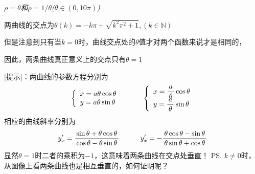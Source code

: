\begin{center}
	
	{\it$\rho=\theta$和$\rho=1/\theta$\quad($\theta\in(0,10\pi)$)
	
	两曲线的交点为$\theta(k)=-k\pi+\sqrt{k^2\pi^2+1},(k\in\mathbb{N})$
	
	但是注意到只有当$k=0$时，曲线交点处的$\theta$值才对两个函数来说才是相同的，
	
	因此，两条曲线真正意义上的交点只有$\theta=1$
	}
\end{center}

[提示]：两曲线的参数方程分别为
$$
\left\{\begin{array}{l}
	x=a\theta\cos\theta\\
	y=a\theta\sin\theta
\end{array}\right.
\quad\quad\quad
\left\{\begin{array}{l}
	x=\displaystyle\frac{\,{a}\,}{\,{\theta}\,}\cos\theta\\
	y=\displaystyle\frac{\,{a}\,}{\,{\theta}\,}\sin\theta
\end{array}\right.
$$
相应的曲线斜率分别为
$$y'_x=\displaystyle\frac{\,{\sin\theta+\theta\cos\theta}\,}{\,{\cos\theta-\theta\sin\theta}\,}
\quad\quad\quad
y'_x=-\displaystyle\frac{\,{\theta\cos\theta-\sin\theta}\,}{\,{\theta\sin\theta+\cos\theta}\,}
$$
显然$\theta=1$时二者的乘积为$-1$，这意味着两条曲线在交点处垂直！
\ps{$k\ne0$时，从图像上看两条曲线也是相互垂直的，如何证明呢？}

